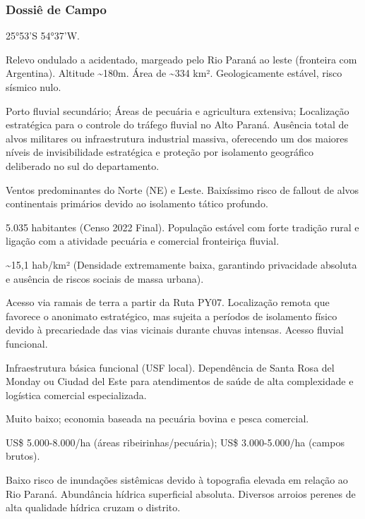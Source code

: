 \subsubsection{Dossiê de Campo}
\begin{description}[style=nextline,leftmargin=0.5cm,font=\bfseries]
\item[Coordenadas]  25°53'S 54°37'W.
\item[Topografia]  Relevo ondulado a acidentado, margeado pelo Rio Paraná ao leste (fronteira com Argentina). Altitude \textasciitilde 180m. Área de \textasciitilde 334 km². Geologicamente estável, risco sísmico nulo.
\item[Alvos Estratégicos]  Porto fluvial secundário; Áreas de pecuária e agricultura extensiva; Localização estratégica para o controle do tráfego fluvial no Alto Paraná. Ausência total de alvos militares ou infraestrutura industrial massiva, oferecendo um dos maiores níveis de invisibilidade estratégica e proteção por isolamento geográfico deliberado no sul do departamento.
\item[Fallout]  Ventos predominantes do Norte (NE) e Leste. Baixíssimo risco de fallout de alvos continentais primários devido ao isolamento tático profundo.
\item[População]  5.035 habitantes (Censo 2022 Final). População estável com forte tradição rural e ligação com a atividade pecuária e comercial fronteiriça fluvial.
\item[Densidade]  \textasciitilde 15,1 hab/\allowbreak km² (Densidade extremamente baixa, garantindo privacidade absoluta e ausência de riscos sociais de massa urbana).
\item[Vias de Acesso]  Acesso via ramais de terra a partir da Ruta PY07. Localização remota que favorece o anonimato estratégico, mas sujeita a períodos de isolamento físico devido à precariedade das vias vicinais durante chuvas intensas. Acesso fluvial funcional.
\item[Serviços]  Infraestrutura básica funcional (USF local). Dependência de Santa Rosa del Monday ou Ciudad del Este para atendimentos de saúde de alta complexidade e logística comercial especializada.
\item[Custo de Vida]  Muito baixo; economia baseada na pecuária bovina e pesca comercial.
\item[Preço da Terra]  US\$ 5.000-8.000/\allowbreak ha (áreas ribeirinhas/\allowbreak pecuária); US\$ 3.000-5.000/\allowbreak ha (campos brutos).
\item[Hidrologia]  Baixo risco de inundações sistêmicas devido à topografia elevada em relação ao Rio Paraná. Abundância hídrica superficial absoluta. Diversos arroios perenes de alta qualidade hídrica cruzam o distrito.

\end{description}
